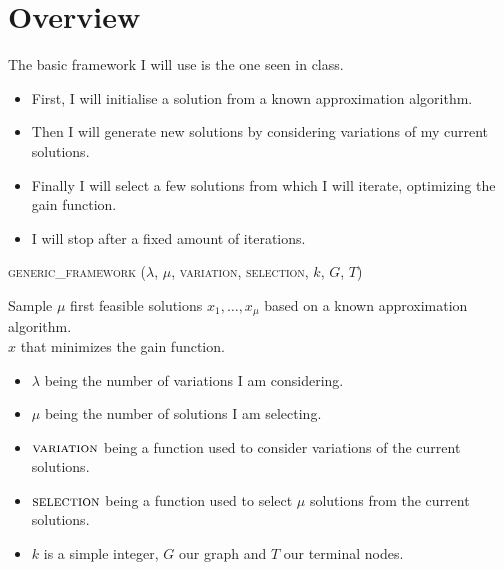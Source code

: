 \documentclass{article}
\theoremstyle{plain} %
\theoremstyle{definition} %
\begin{document}
\section{Overview}

The basic framework I will use is the one seen in class.

\begin{itemize}
\item First, I will initialise a solution from a known approximation algorithm.

\item Then I will generate new solutions by considering variations of my
current solutions.

\item Finally I will select a few solutions from which I will iterate,
optimizing the gain function.

\item I will stop after a fixed amount of iterations.
\end{itemize}

\begin{algorithm}

\caption{\textsc{generic\_framework} ($\lambda$, $\mu$, \textsc{variation},
\textsc{selection}, $k$, $G$, $T$)}

Sample $\mu$ first feasible solutions $x_1,\ldots,x_\mu$ based on a known
approximation algorithm.\\

\Return $x$ that minimizes the gain function.

\end{algorithm}

\begin{itemize}

\item $\lambda$ being the number of variations I am considering.

\item $\mu$ being the number of solutions I am selecting.

\item $\textsc{variation}$ being a function used to consider variations of the
current solutions.

\item $\textsc{selection}$ being a function used to select $\mu$ solutions from
the current solutions.

\item $k$ is a simple integer, $G$ our graph and $T$ our terminal nodes.

\end{itemize}
\end{document}
